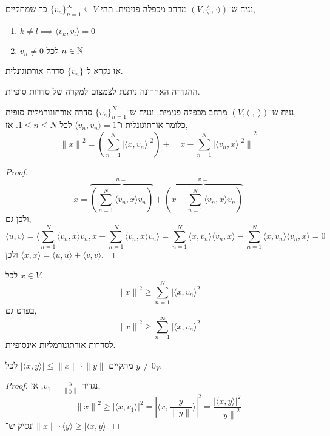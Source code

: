 \begin{definition}
	נניח ש־$(V, \langle \cdot, \cdot \rangle)$ מרחב מכפלה פנימית.
	תהי ${\{ v_n \}}_{n = 1}^\infty \subseteq V$ כך שמתקיים,
	\begin{enumerate}
		\item $k \ne l \implies \langle v_k, v_l \rangle = 0$
		\item $v_n \ne 0$ לכל $n \in \mathbb{N}$
	\end{enumerate}
	אז נקרא ל־$\{ v_n \}$ סדרה אורתוגונלית.
\end{definition}
\begin{remark}
	ההגדרה האחרונה ניתנת לצמצום למקרה של סדרות סופיות.
\end{remark}
\begin{theorem}[הפיתגורי]
	נניח ש־$(V, \langle \cdot, \cdot \rangle)$ מרחב מכפלה פנימית,
	ונניח ש־${\{ v_n \}}_{n = 1}^N$ סדרה אורתונורמלית סופית, \\
	כלומר אורתוגונלית ו־$\langle v_n, v_n \rangle = 1$ לכל $1 \le n \le N$.
	אז,
	\[
		{\lVert x \rVert}^2
		= \left( \sum_{n = 1}^N {|\langle x, v_n \rangle|}^2 \right) + {\lVert x - \sum_{n = 1}^N {|\langle v_n, x \rangle|}^2 \rVert}^2
	\]
\end{theorem}
\begin{proof}
	\[
		x = \overbrace{\left( \sum_{n = 1}^N \langle v_n, x \rangle v_n \right)}^{u = } + \overbrace{\left( x - \sum_{n = 1}^N \langle v_n, x \rangle v_n \right)}^{v = }
	\]
	ולכן גם,
	\[
		\langle u, v \rangle
		= \langle \sum_{n = 1}^N \langle v_n, x \rangle v_n, x - \sum_{n = 1}^N \langle v_n, x \rangle v_n \rangle
		= \sum_{n = 1}^N \langle x, v_n \rangle \langle v_n, x \rangle - \sum_{n = 1}^N \langle x, v_n \rangle \langle v_n, x \rangle
		= 0
	\]
	ולכן $\langle x, x \rangle = \langle u, u \rangle + \langle v, v \rangle$.
\end{proof}
\begin{conclusion}
	לכל $x \in V$,
	\[
		{\lVert x \rVert}^2
		\ge \sum_{n = 1}^N {|\langle x, v_n \rangle}^2
	\]
	בפרט גם,
	\[
		{\lVert x \rVert}^2
		\ge \sum_{n = 1}^\infty {|\langle x, v_n \rangle}^2
	\]
	לסדרות אורתונורמליות אינסופיות.
\end{conclusion}
\begin{conclusion}
	מתקיים $|\langle x, y \rangle| \le \lVert x \rVert \cdot \lVert y \rVert$ לכל $y \ne 0_V$.
\end{conclusion}
\begin{proof}
	נגדיר $v_1 = \frac{y}{\lVert y \rVert}$, אז,
	\[
		{\lVert x \rVert}^2
		\ge {|\langle x, v_1 \rangle|}^2
		= {|\langle x, \frac{y}{\lVert y \rVert} \rangle|}^2
		= \frac{{|\langle x, y \rangle|}^2}{{\lVert y \rVert}^2}
	\]
	ונסיק ש־$\lVert x \rVert \cdot \langle y \rangle \ge |\langle x, y \rangle|$
\end{proof}
